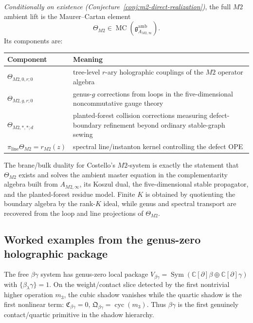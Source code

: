 \begin{definition}
\label{def:m2-master-lift}
\emph{Conditionally on existence (Conjecture~\ref{conj:m2-direct-realization})}, the full $M2$ ambient lift is the Maurer--Cartan element
\[
\Theta_{M2}
\in
\operatorname{MC}(\mathfrak{g}^{\mathrm{amb}}_{A_{M2,\infty}}).
\]
Its components are:
\begin{center}
\begin{tabular}{@{}p{}p{}@{}}
\toprule
Component & Meaning \\
\midrule
$\Theta_{M2,0,r;0}$ & tree-level $r$-ary holographic
couplings of the $M2$ operator algebra \\
$\Theta_{M2,g,r;0}$ & genus-$g$ corrections from loops in
the five-dimensional noncommutative gauge theory \\
$\Theta_{M2,\ast,\ast;d}$ & planted-forest collision
corrections measuring defect-boundary refinement beyond
ordinary stable-graph sewing \\
$\pi_{\mathrm{line}}\Theta_{M2} = r_{M2}(z)$ & spectral
line/instanton kernel controlling the defect OPE \\
\bottomrule
\end{tabular}
\end{center}
\end{definition}

\begin{conjecture}
\label{conj:m2-direct-realization}
\ClaimStatusConjectured
The brane/bulk duality for Costello's $M2$-system is exactly the
statement that $\Theta_{M2}$ exists and solves the ambient master
equation in the complementarity algebra built from
$A_{M2,\infty}$, its Koszul dual, the five-dimensional stable
propagator, and the planted-forest residue model. Finite $K$ is
obtained by quotienting the boundary algebra by the rank-$K$ ideal,
while genus and spectral transport are recovered from the loop and
line projections of $\Theta_{M2}$.
\end{conjecture}

\subsection{Worked examples from the genus-zero holographic package}
\label{subsec:holographic-worked-examples}

\begin{example}
\label{ex:betagamma-quartic-primitive}
The free $\beta\gamma$ system has genus-zero local package
$V_{\beta\gamma} = \operatorname{Sym}(\mathbb{C}[\partial]\beta
\oplus \mathbb{C}[\partial]\gamma)$ with
$\{\beta_\lambda\gamma\} = 1$. On the weight/contact slice
detected by the first nontrivial higher operation $m_3$, the cubic
shadow vanishes while the quartic shadow is the first nonlinear
term:
$\mathfrak{C}_{\beta\gamma} = 0$,
$\mathfrak{Q}_{\beta\gamma} = \operatorname{cyc}(m_3)$.
Thus $\beta\gamma$ is the first genuinely contact/quartic primitive
in the shadow hierarchy.
\end{example}

